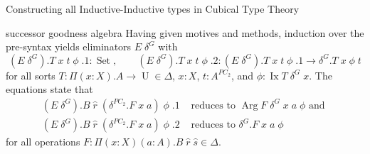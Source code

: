 \documentclass[acmsmall,review]{acmart}\settopmatter{printfolios=true,printccs=false,printacmref=false}
\DeclareMathOperator{\USet}{Set}
\DeclareMathOperator{\UU}{U}
\DeclareMathOperator{\Arg}{Arg}
\DeclareMathOperator{\Ix}{Ix}
\begin{document}
\begin{section}{Constructing all Inductive-Inductive types in Cubical Type Theory}
\begin{subsection}{successor goodness algebra}
Having given motives and methods, induction over the pre-syntax yields eliminators $E\;\delta^G$ with \[(E\;\delta^G).T\;x\;t\;\phi\;.1 : \USet,\qquad (E\;\delta^G).T\;x\;t\;\phi\;.2 : (E\;\delta^G).T\;x\;t\;\phi\;.1 \to \delta^G.T\;x\;\phi\;t\] for all sorts $T : \Pi(x : X).A \to \UU \in \Delta$, $x : X$, $t : A^{PC_2}$, and $\phi : \Ix T\;\delta^G\;x$. The equations state that \begin{align*}(E\;\delta^G).B\;\hat{r}\;(\delta^{PC_2}.F\;x\;a)\;\phi\;.1&\text{ reduces to }\Arg F\;\delta^G\;x\;a\;\phi\text{ and }\\(E\;\delta^G).B\;\hat{r}\;(\delta^{PC_2}.F\;x\;a)\;\phi\;.2&\text{ reduces to }\delta^G.F\;x\;a\;\phi\end{align*} for all operations $F : \Pi(x : X)(a : A).B\;\hat{r}\;\hat{s}\in \Delta$.


\end{subsection}
\end{section}
\end{document}
